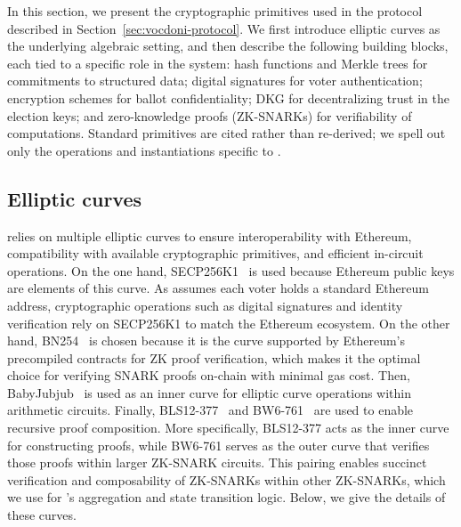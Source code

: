 %


In this section, we present the cryptographic primitives used in the protocol described in Section~\ref{sec:vocdoni-protocol}. We first introduce elliptic curves as the underlying algebraic setting, and then describe the following building blocks, each tied to a specific role in the system: hash functions and Merkle trees for commitments to structured data; digital signatures for voter authentication; encryption schemes for ballot confidentiality; \ac{DKG} for decentralizing trust in the election keys; and zero-knowledge proofs (\acp{ZK-SNARK}) for verifiability of computations. Standard primitives are cited rather than re-derived; we spell out only the operations and instantiations specific to \davinci.

\subsection{Elliptic curves}
\label{sec:cryptographic-primitives:elliptic-curves}

\Davinci relies on multiple elliptic curves to ensure interoperability with Ethereum, compatibility with available cryptographic primitives, and efficient in-circuit operations. On the one hand, SECP256K1~\cite{brown2010sec} is used because Ethereum public keys are elements of this curve. As \Davinci assumes each voter holds a standard Ethereum address, cryptographic operations such as digital signatures and identity verification rely on SECP256K1 to match the Ethereum ecosystem. On the other hand, BN254~\cite{wood2014ethereum} is chosen because it is the curve supported by Ethereum's precompiled contracts for ZK proof verification, which makes it the optimal choice for verifying SNARK proofs on-chain with minimal gas cost. Then, BabyJubjub~\cite{belles2021twisted} is used as an inner curve for elliptic curve operations within arithmetic circuits. Finally, BLS12-377~\cite{bowe2020zexe} and BW6-761~\cite{elhousni2020optimized} are used to enable recursive proof composition. More specifically, BLS12-377 acts as the inner curve for constructing proofs, while BW6-761 serves as the outer curve that verifies those proofs within larger ZK-SNARK circuits. This pairing enables succinct verification and composability of ZK-SNARKs within other ZK-SNARKs, which we use for \davinci's aggregation and state transition logic. Below, we give the details of these curves.

